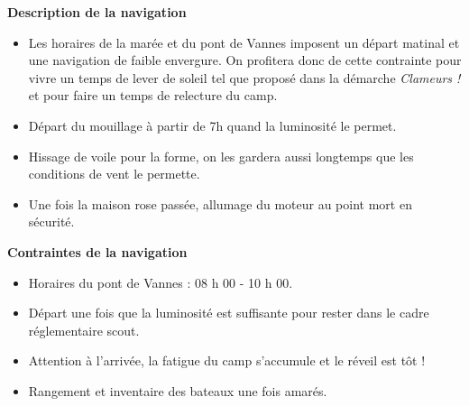 \begin{minipage}[c][\textheight][t]{0.10\textwidth}
\hfill
\end{minipage}%
\begin{minipage}[c][\textheight][t]{0.50\textwidth}
    \vspace{4cm}
    \color{StrongBlue}    
    {\huge \textbf{Description de la navigation}}\\
            \begin{itemize}
                \item Les horaires de la marée et du pont de Vannes imposent un départ matinal et une navigation de faible envergure. On profitera donc de cette contrainte pour vivre un temps de lever de soleil tel que proposé dans la démarche \textit{Clameurs !} et pour faire un temps de relecture du camp. 
                \item Départ du mouillage à partir de 7h quand la luminosité le permet. 
                \item Hissage de voile pour la forme, on les gardera aussi longtemps que les conditions de vent le permette. 
                \item Une fois la maison rose passée, allumage du moteur au point mort en sécurité.  
            \end{itemize}
        {
        \huge \textbf{Contraintes de la navigation}}\\
            \begin{itemize}
                \item Horaires du pont de Vannes : 08 h 00 - 10 h 00. 
                \item Départ une fois que la luminosité est suffisante pour rester dans le cadre réglementaire scout. 
                \item Attention à l'arrivée, la fatigue du camp s'accumule et le réveil est tôt ! 
                \item Rangement et inventaire des bateaux une fois amarés. 
            \end{itemize}
\end{minipage}%
